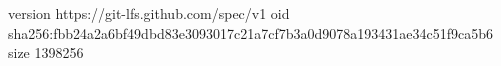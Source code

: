 version https://git-lfs.github.com/spec/v1
oid sha256:fbb24a2a6bf49dbd83e3093017c21a7cf7b3a0d9078a193431ae34c51f9ca5b6
size 1398256
